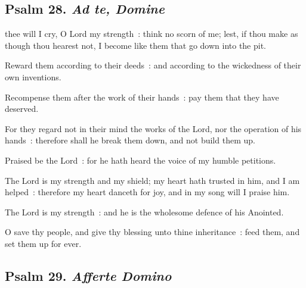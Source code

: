 \subsection{Psalm 28. \textit{Ad te, Domine}}

 thee will I cry, O Lord my strength~: think no scorn of me; lest, if thou make as though thou hearest not, I become like them that go down into the pit.\par
{}
Reward them according to their deeds~: and according to the wickedness of their own inventions.\par
{}Recompense them after the work of their hands~: pay them that they have deserved.\par
{}For they regard not in their mind the works of the Lord, nor the operation of his hands~: therefore shall he break them down, and not build them up.\par
{}Praised be the Lord~: for he hath heard the voice of my humble petitions.\par
{}The Lord is my strength and my shield; my heart hath trusted in him, and I am helped~: therefore my heart danceth for joy, and in my song will I praise him.\par
{}The Lord is my strength~: and he is the wholesome defence of his Anointed.\par
{}O save thy people, and give thy blessing unto thine inheritance~: feed them, and set them up for ever.\par

\subsection{Psalm 29. \textit{Afferte Domino}}

